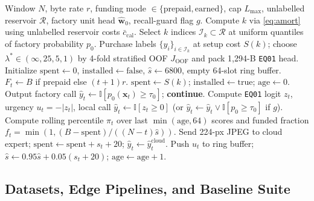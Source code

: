 \documentclass[preprint,12pt,authoryear]{elsarticle}
\begin{document}
\begin{algorithm}[t]
\caption{BASA Causal Online Supervision and Single-Frame Deferral}
\label{alg:basa}
\begin{algorithmic}[1]
\REQUIRE Window $N$, byte rate $r$, funding mode $\in\{\text{prepaid},\text{earned}\}$, cap $L_{\max}$, unlabelled reservoir $\mathcal{R}$, factory unit head $\hat{\mathbf{w}}_0$, recall-guard flag $g$.
\STATE Compute $k$ via \eqref{eq:amort} using unlabelled reservoir costs $\bar{c}_{\mathrm{cal}}$.
\STATE Select $k$ indices $\mathcal{I}_k \subset \mathcal{R}$ at uniform quantiles of factory probability $p_0$.
\STATE Purchase labels $\{y_i\}_{i\in\mathcal{I}_k}$ at setup cost $S(k)$; choose $\lambda^* \in (\infty, 25, 5, 1)$ by 4-fold stratified OOF $J_{\mathrm{OOF}}$ and pack 1,294-B \texttt{EQ01} head.
\STATE Initialize $\mathrm{spent} \leftarrow 0$, $\mathrm{installed} \leftarrow \text{false}$, $\hat{s} \leftarrow 6800$, empty 64-slot ring buffer.
  \STATE $F_t \leftarrow B$ if prepaid else $(t+1)r$.
    \STATE $\mathrm{spent} \leftarrow S(k)$; $\mathrm{installed} \leftarrow \text{true}$; $\mathrm{age} \leftarrow 0$.
  \ENDIF
    \STATE Output factory call $\hat{y}_t \leftarrow \mathbb{I}[p_0(\mathbf{x}_t) \ge \tau_0]$; \textbf{continue}.
  \ENDIF
  \STATE Compute \texttt{EQ01} logit $z_t$, urgency $u_t = -|z_t|$, local call $\hat{y}_t \leftarrow \mathbb{I}[z_t \ge 0]$ (or $\hat{y}_t \leftarrow \hat{y}_t \vee \mathbb{I}[p_0 \ge \tau_0]$ if $g$).
  \STATE Compute rolling percentile $\pi_t$ over last $\min(\mathrm{age}, 64)$ scores and funded fraction $f_t = \min(1, (B-\mathrm{spent})/((N-t)\hat{s}))$.
    \STATE Send 224-px JPEG to cloud expert; $\mathrm{spent} \leftarrow \mathrm{spent} + s_t + 20$; $\hat{y}_t \leftarrow \hat{y}_t^{\mathrm{cloud}}$.
  \ENDIF
  \STATE Push $u_t$ to ring buffer; $\hat{s} \leftarrow 0.95\hat{s} + 0.05(s_t+20)$; $\mathrm{age} \leftarrow \mathrm{age}+1$.
\ENDFOR
\end{algorithmic}
\end{algorithm}

\subsection{Datasets, Edge Pipelines, and Baseline Suite}
\label{sec:setup}
\end{document}
